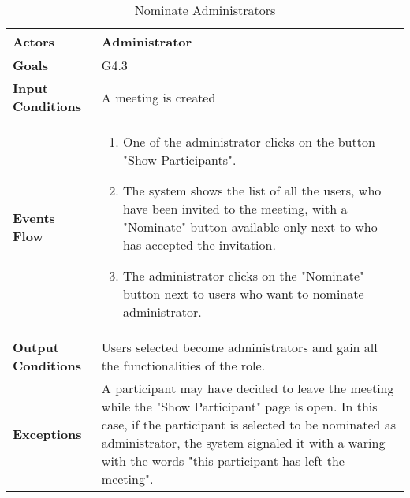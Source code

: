 \begin{table}[H]
	\centering
	\def\arraystretch{1.5}
	\begin{tabular}{|p{7cm}|p{7cm}|}
		\hline
		\textbf{Actors}            & Administrator    \\ \hline
		\textbf{Goals}             & G4.3           \\ \hline
		\textbf{Input Conditions}  & A meeting is created           \\ \hline
		\textbf{Events Flow}       &  
		\begin{enumerate}[topsep=0pt, leftmargin=*]
			\item One of the administrator clicks on the button "Show Participants".
			\item The system shows the list of all the users, who have been invited to the meeting, with a "Nominate" button available only next to who has accepted the invitation.
			\item The administrator clicks on the "Nominate" button next to users who want to nominate administrator.
		\end{enumerate}             \\ \hline
		\textbf{Output Conditions} & Users selected become administrators and gain all the functionalities of the role.           \\ \hline
		\textbf{Exceptions}        & A participant may have decided to leave the meeting while the "Show Participant" page is open. In this case, if the participant is selected to be nominated as administrator, the system signaled it with a waring with the words "this participant has left the meeting".      \\ \hline
	\end{tabular}
	\caption{Nominate Administrators}
\end{table}


